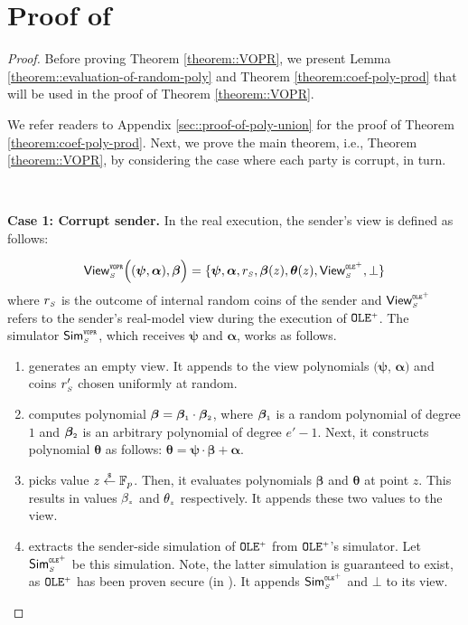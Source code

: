 




\section{Proof of \vopr}\label{sec::proof-of-vopr}
\begin{proof}

Before proving Theorem \ref{theorem::VOPR}, we present Lemma \ref{theorem::evaluation-of-random-poly} and Theorem \ref{theorem:coef-poly-prod} that will be used in the proof of Theorem \ref{theorem::VOPR}. 






We refer readers to Appendix \ref{sec::proof-of-poly-union} for the proof of Theorem \ref{theorem:coef-poly-prod}. Next, we  prove the main theorem, i.e., Theorem \ref{theorem::VOPR}, by considering the case where each party is corrupt, in turn. 



\

\noindent\textbf{Case 1: Corrupt sender.} In the real execution, the sender's view is defined as follows: 


$$ \mathsf{View}_{\scriptscriptstyle S}^{\scriptscriptstyle \mathtt{VOPR}} \Big((\bm\psi, \bm{\alpha}), \bm\beta\Big)=\{\bm\psi, \bm{\alpha}, r_{\scriptscriptstyle S},  \bm\beta(z), \bm\theta(z), \mathsf{View}^{\scriptscriptstyle \mathtt{OLE}^{\scriptscriptstyle +}}_{\scriptscriptstyle S}, \bot \}$$
%
where $r_{\scriptscriptstyle S}$ is the outcome of internal random coins of the sender and $\mathsf{View}^{\scriptscriptstyle \mathtt{OLE}^{\scriptscriptstyle +}}_{\scriptscriptstyle S}$ refers to the sender's real-model view during the execution of  $\mathtt{OLE}^{\scriptscriptstyle +}$. The simulator $\mathsf{Sim}^{\scriptscriptstyle \mathtt{VOPR}}_{\scriptscriptstyle S}$, which receives $\bm\psi$ and $\bm \alpha$, works as follows. 
%
\begin{enumerate}
\item generates an empty view. It appends to the view polynomials $(\bm\psi$, $\bm{\alpha})$ and coins $r'_{\scriptscriptstyle S}$ chosen uniformly at random. 
%
\item computes polynomial $\bm\beta=\bm\beta_{\scriptscriptstyle 1} \cdot \bm\beta_{\scriptscriptstyle 2}$, where $\bm\beta_{\scriptscriptstyle 1}$ is a random polynomial of degree $1$ and $\bm\beta_{\scriptscriptstyle 2}$ is an arbitrary polynomial of degree $e'-1$. Next,  it constructs polynomial $\bm\theta$ as follows: $\bm\theta=\bm\psi\cdot \bm\beta+\bm \alpha$.

\item picks value $z\stackrel{\scriptscriptstyle\$}\leftarrow \mathbb{F}_{p}$. Then, it evaluates polynomials $\bm\beta$ and $\bm\theta$  at point $z$. This results in values $\beta_{\scriptscriptstyle z}$ and $\theta_{\scriptscriptstyle z}$ respectively. It appends these two values to the view. 
\item extracts the sender-side simulation of $\mathtt{OLE}^{\scriptscriptstyle +}$ from  $\mathtt{OLE}^{\scriptscriptstyle +}$'s simulator. Let $\mathsf{Sim}^{\scriptscriptstyle \mathtt{OLE}^{\scriptscriptstyle +}}_{\scriptscriptstyle S}$ be this simulation. Note, the latter simulation is guaranteed to exist, as $\mathtt{OLE}^{\scriptscriptstyle +}$ has been proven secure (in \cite{GhoshN19}). It appends $\mathsf{Sim}^{\scriptscriptstyle \mathtt{OLE}^{\scriptscriptstyle +}}_{\scriptscriptstyle S}$ and $\bot$ to its view. 
\end{enumerate}



\end{proof}
